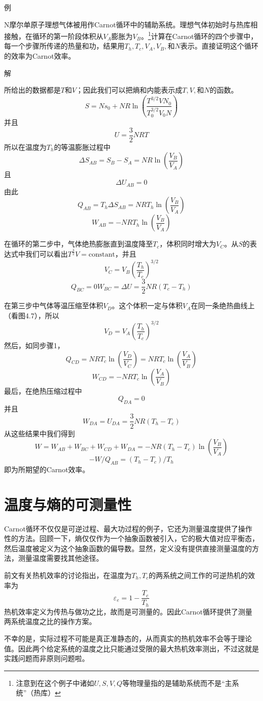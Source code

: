例

N摩尔单原子理想气体被用作Carnot循环中的辅助系统。理想气体初始时与热库相接触，在循环的第一阶段体积从$V_A$膨胀为$V_B$。\footnote{注意到在这个例子中诸如$U,S,V,Q$等物理量指的是辅助系统而不是“主系统”（热库）}计算在Carnot循环的四个步骤中，每一个步骤所传递的热量和功，结果用$T_h,T_c,V_A,V_B,$和$N$表示。直接证明这个循环的效率为Carnot效率。

解

\noindent 所给出的数据都是$T$和$V$；因此我们可以把熵和内能表示成$T,V,$和$N$的函数。
\[S = Ns_0 + NR\ln(\frac{T^{3/2}VN_0}{T_0^{3/2}V_0N})\]
并且
\[U = \frac{3}{2}NRT\]
所以在温度为$T_h$的等温膨胀过程中
\[\Delta S_{AB} = S_B - S_A = NR\ln(\frac{V_B}{V_A})\]
且
\[\Delta U_{AB} = 0\]
由此
\[Q_{AB} = T_h\Delta S_{AB} = NRT_h\ln(\frac{V_B}{V_A})\]
\[W_{AB} = -NRT_h\ln(\frac{V_B}{V_A})\]

在循环的第二步中，气体绝热膨胀直到温度降至$T_c$，体积同时增大为$V_C$。从$S$的表达式中我们可以看出$T^{\frac{3}{2}}V = \text{constant}$，并且
\[V_C = V_B(\frac{T_h}{T_c})^{3/2}\]
\[Q_{BC}=0  W_{BC}=\Delta U = \frac{3}{2}NR(T_c - T_h)\]

在第三步中气体等温压缩至体积$V_D$。这个体积一定与体积$V_A$在同一条绝热曲线上（看图4.7），所以
\[V_D = V_A(\frac{T_h}{T_c})^{3/2}\]
然后，如同步骤1，
\[Q_{CD} = NRT_c\ln(\frac{V_D}{V_C}) = NRT_c\ln(\frac{V_A}{V_B})\]
\[W_{CD} = -NRT_c\ln(\frac{V_A}{V_B})\]
最后，在绝热压缩过程中
\[Q_{DA} = 0\]
并且
\[W_{DA} = U_{DA} = \frac{3}{2}NR(T_h - T_c)\]
从这些结果中我们得到
\[W = W_{AB} + W_{BC} + W_{CD} + W_{DA} = -NR(T_h - T_c)\ln(\frac{V_B}{V_A})\]
\[-W/Q_{AB} = (T_h - T_c)/T_h\]
即为所期望的Carnot效率。

\section{温度与熵的可测量性}
\label{sec4.8}
Carnot循环不仅仅是可逆过程、最大功过程的例子，它还为测量温度提供了操作性的方法。回顾一下，熵仅仅作为一个抽象函数被引入，它的极大值对应平衡态，然后温度被定义为这个抽象函数的偏导数。显然，定义没有提供直接测量温度的方法，测量温度需要找其他途径。

前文有关热机效率的讨论指出，在温度为$T_h, T_c$的两系统之间工作的可逆热机的效率为
\begin{equation}
	\varepsilon_e = 1 - \frac{T_c}{T_h}
\label{equ4.19}
\end{equation}
热机效率定义为传热与做功之比，故而是可测量的。因此Carnot循环提供了测量两系统温度之比的操作方案。

不幸的是，实际过程不可能是真正准静态的，从而真实的热机效率不会等于理论值。因此两个给定系统的温度之比只能通过受限的最大热机效率测出，不过这就是实践问题而非原则问题啦。

